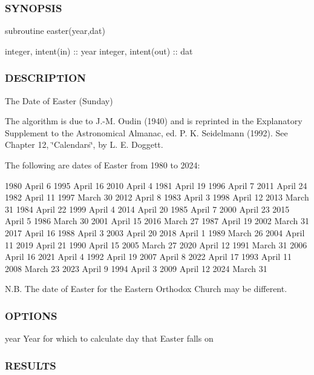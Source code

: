 \subsubsection*{S\+Y\+N\+O\+P\+S\+IS}

subroutine easter(year,dat)

integer, intent(in) \+:\+: year integer, intent(out) \+:\+: dat

\subsubsection*{D\+E\+S\+C\+R\+I\+P\+T\+I\+ON}

The Date of Easter (Sunday)

The algorithm is due to J.-\/M. Oudin (1940) and is reprinted in the Explanatory Supplement to the Astronomical Almanac, ed. P. K. Seidelmann (1992). See Chapter 12, \char`\"{}\+Calendars\char`\"{}, by L. E. Doggett.

The following are dates of Easter from 1980 to 2024\+: \begin{DoxyVerb}1980  April  6        1995  April 16        2010  April  4
1981  April 19        1996  April  7        2011  April 24
1982  April 11        1997  March 30        2012  April  8
1983  April  3        1998  April 12        2013  March 31
1984  April 22        1999  April  4        2014  April 20
1985  April  7        2000  April 23        2015  April  5
1986  March 30        2001  April 15        2016  March 27
1987  April 19        2002  March 31        2017  April 16
1988  April  3        2003  April 20        2018  April  1
1989  March 26        2004  April 11        2019  April 21
1990  April 15        2005  March 27        2020  April 12
1991  March 31        2006  April 16        2021  April  4
1992  April 19        2007  April  8        2022  April 17
1993  April 11        2008  March 23        2023  April  9
1994  April  3        2009  April 12        2024  March 31
\end{DoxyVerb}
 \begin{DoxyVerb} N.B. The date of Easter for the Eastern Orthodox Church may be different.
\end{DoxyVerb}


\subsubsection*{O\+P\+T\+I\+O\+NS}

year Year for which to calculate day that Easter falls on \subsubsection*{R\+E\+S\+U\+L\+TS}


